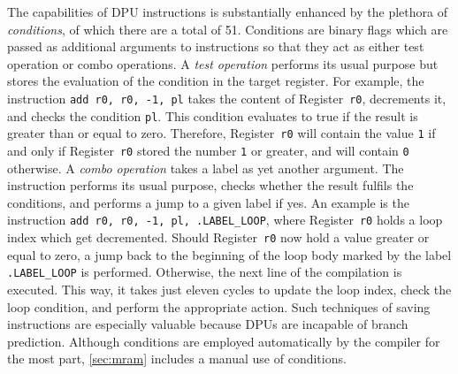 The capabilities of \ac{DPU} instructions is substantially enhanced by the plethora of \emph{conditions}, of which there are a total of 51.
Conditions are binary flags which are passed as additional arguments to instructions so that they act as either test operation or combo operations.
A \emph{test operation} performs its usual purpose but stores the evaluation of the condition in the target register.
For example, the instruction \lstinline|add r0, r0, -1, pl| takes the content of Register~\lstinline|r0|, decrements it, and checks the condition \lstinline|pl|.
This condition evaluates to true if the result is greater than or equal to zero.
Therefore, Register~\lstinline|r0| will contain the value \lstinline|1| if and only if Register~\lstinline|r0| stored the number \lstinline|1| or greater, and will contain \lstinline|0| otherwise.
A \emph{combo operation} takes a label as yet another argument.
The instruction performs its usual purpose, checks whether the result fulfils the conditions, and performs a jump to a given label if yes.
An example is the instruction \lstinline|add r0, r0, -1, pl, .LABEL_LOOP|, where Register~\lstinline|r0| holds a loop index which get decremented.
Should Register~\lstinline|r0| now hold a value greater or equal to zero, a jump back to the beginning of the loop body marked by the label \lstinline|.LABEL_LOOP| is performed.
Otherwise, the next line of the compilation is executed.
This way, it takes just eleven cycles to update the loop index, check the loop condition, and perform the appropriate action.
Such techniques of saving instructions are especially valuable because \acp{DPU} are incapable of branch prediction.
Although conditions are employed automatically by the compiler for the most part, \cref{sec:mram} includes a manual use of conditions.
